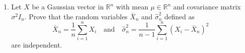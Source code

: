 \documentclass[a4paper,10pt,fleqn]{article}
\newcommand{\rset}{\ensuremath{\mathbb{R}}}
\newcommand{\1}{\ensuremath{\mathbbm{1}}}
\begin{document}
\begin{enumerate}
\item Let $X$ be a Gaussian vector in $\rset^n$ with mean $\mu\in\rset^n$ and covariance matrix $\sigma^2 I_n$. Prove that the random variables $\bar X_n$ and $\widehat \sigma^2_n$ defined as
$$
\bar X_n = \frac{1}{n}\sum_{i=1}^n X_i\quad \mathrm{and} \quad \widehat \sigma^2_n = \frac{1}{n-1}\sum_{i=1}^n (X_i - \bar X_n)^2
$$
are independent.

%
\end{enumerate}
\end{document}
